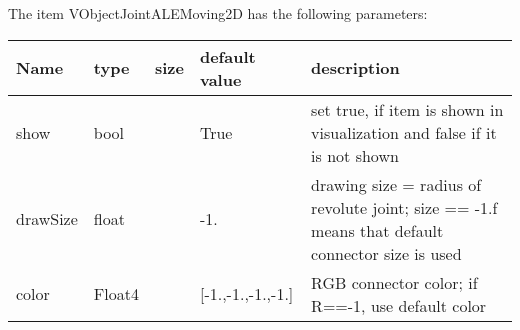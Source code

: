The item VObjectJointALEMoving2D has the following parameters:
\begin{center}
  \footnotesize
  \begin{longtable}{| p{4.5cm} | p{2.5cm} | p{0.5cm} | p{2.5cm} | p{6cm} |}
    \hline
    \bf Name & \bf type & \bf size & \bf default value & \bf description \\ \hline
    show &     bool &      &     True &     set true, if item is shown in visualization and false if it is not shown\\ \hline
    drawSize &     float &      &     -1. &     drawing size = radius of revolute joint; size == -1.f means that default connector size is used\\ \hline
    color &     Float4 &      &     [-1.,-1.,-1.,-1.] &     RGB connector color; if R==-1, use default color\\ \hline
	  \end{longtable}
	\end{center}

